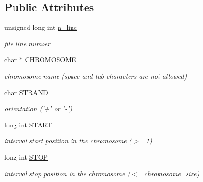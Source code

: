 \subsection*{Public Attributes}
\begin{DoxyCompactItemize}
\item 
\hypertarget{classGenomicInterval_a0dbe6195570468c386eea923e30c762c}{
unsigned long int \hyperlink{classGenomicInterval_a0dbe6195570468c386eea923e30c762c}{n\_\-line}}
\label{classGenomicInterval_a0dbe6195570468c386eea923e30c762c}

\begin{DoxyCompactList}\small\item\em file line number \end{DoxyCompactList}\item 
\hypertarget{classGenomicInterval_ac489a1195c43cc93d0e192dc91d5a192}{
char $\ast$ \hyperlink{classGenomicInterval_ac489a1195c43cc93d0e192dc91d5a192}{CHROMOSOME}}
\label{classGenomicInterval_ac489a1195c43cc93d0e192dc91d5a192}

\begin{DoxyCompactList}\small\item\em chromosome name (space and tab characters are not allowed) \end{DoxyCompactList}\item 
\hypertarget{classGenomicInterval_a25f6603b48fcc57f97c89fa768b658f9}{
char \hyperlink{classGenomicInterval_a25f6603b48fcc57f97c89fa768b658f9}{STRAND}}
\label{classGenomicInterval_a25f6603b48fcc57f97c89fa768b658f9}

\begin{DoxyCompactList}\small\item\em orientation ('+' or '-\/') \end{DoxyCompactList}\item 
\hypertarget{classGenomicInterval_ac0abba93599f5cdf4b5a4e7ec5909bbd}{
long int \hyperlink{classGenomicInterval_ac0abba93599f5cdf4b5a4e7ec5909bbd}{START}}
\label{classGenomicInterval_ac0abba93599f5cdf4b5a4e7ec5909bbd}

\begin{DoxyCompactList}\small\item\em interval start position in the chromosome ($>$=1) \end{DoxyCompactList}\item 
\hypertarget{classGenomicInterval_ac5fac21da3939b7976859a54800b93f0}{
long int \hyperlink{classGenomicInterval_ac5fac21da3939b7976859a54800b93f0}{STOP}}
\label{classGenomicInterval_ac5fac21da3939b7976859a54800b93f0}

\begin{DoxyCompactList}\small\item\em interval stop position in the chromosome ($<$=chromosome\_\-size) \end{DoxyCompactList}\end{DoxyCompactItemize}


